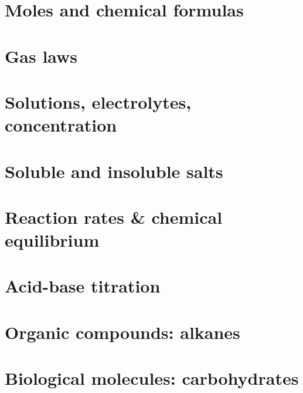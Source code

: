    \newpage\section{ Moles and chemical formulas   }\clearpage\mbox{}\clearpage 
   \newpage\section{  Gas laws  }\clearpage\mbox{}\clearpage 


 \newpage\section{  Solutions, electrolytes, concentration   }\clearpage\mbox{}\clearpage 

 \newpage\section{  Soluble and insoluble salts  }\clearpage\mbox{}\clearpage 
  \newpage\section{  Reaction rates \&  chemical equilibrium   }\clearpage\mbox{}\clearpage 
  \newpage\section{  Acid-base titration   }\clearpage\mbox{}\clearpage 
  \newpage\section{  Organic compounds: alkanes   }\clearpage\mbox{}\clearpage 
  \newpage\section{  Biological molecules: carbohydrates  }\clearpage\mbox{}\clearpage 

 



\clearpage\mbox{}\clearpage
\clearpage\mbox{}\clearpage
\clearpage\mbox{}\clearpage
\newpage
\clearpage\mbox{}\clearpage



